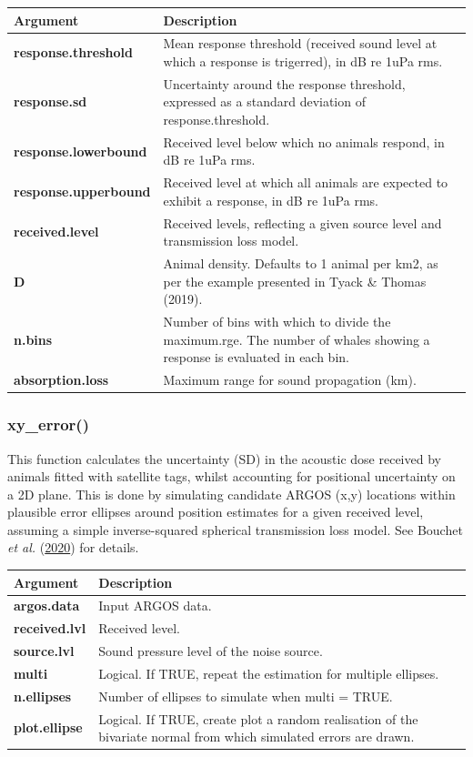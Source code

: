 \documentclass[
]{article}
\begin{document}
\begin{longtable}{>{\bfseries}l|>{\raggedright\arraybackslash}p{30em}}
\toprule
\textbf{Argument} & \textbf{Description}\\
\midrule
response.threshold & Mean response threshold (received sound level at which a response is trigerred), in dB re 1uPa rms.\\
response.sd & Uncertainty around the response threshold, expressed as a standard deviation of response.threshold.\\
response.lowerbound & Received level below which no animals respond, in dB re 1uPa rms.\\
response.upperbound & Received level at which all animals are expected to exhibit a response, in dB re 1uPa rms.\\
received.level & Received levels, reflecting a given source level and transmission loss model.\\
\addlinespace
D & Animal density. Defaults to 1 animal per km2, as per the example presented in Tyack \& Thomas (2019).\\
n.bins & Number of bins with which to divide the maximum.rge. The number of whales showing a response is evaluated in each bin.\\
absorption.loss & Maximum range for sound propagation (km).\\
\bottomrule
\end{longtable}

\hypertarget{xy}{}
\subsubsection{xy\_error()}

This function calculates the uncertainty (SD) in the acoustic dose received by animals fitted with satellite tags, whilst accounting for positional uncertainty on a 2D plane. This is done by simulating candidate ARGOS (x,y) locations within plausible error ellipses around position estimates for a given received level, assuming a simple inverse-squared spherical transmission loss model. See Bouchet \emph{et al.} (\protect\hyperlink{ref-Bouchet2020a}{2020}) for details.

\renewcommand{\arraystretch}{1.4}
\begin{table}[H]
\centering
\begin{tabular}{>{\bfseries}l|>{\raggedright\arraybackslash}p{30em}}
\toprule
\textbf{Argument} & \textbf{Description}\\
\midrule
argos.data & Input ARGOS data.\\
received.lvl & Received level.\\
source.lvl & Sound pressure level of the noise source.\\
multi & Logical. If TRUE, repeat the estimation for multiple ellipses.\\
n.ellipses & Number of ellipses to simulate when multi = TRUE.\\
\addlinespace
plot.ellipse & Logical. If TRUE, create plot a random realisation of the bivariate normal from which simulated errors are drawn.\\
\bottomrule
\end{tabular}
\end{table}
\end{document}
